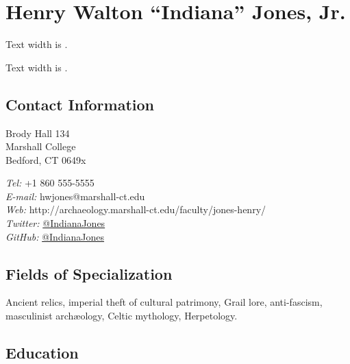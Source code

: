\documentclass[%
    11pt,
  oneside
  ]{memoir}
\begin{document}
      \chapter*{Henry Walton ``Indiana'' Jones, Jr.}
  
  Text width is \the\textwidth.


  \begin{adjustwidth*}{9em}{0em}
  Text width is \the\textwidth.


  \hypertarget{contact-information}{
  \section{Contact Information}\label{contact-information}}
    \begin{minipage}[t]{0.3\textwidth}
      Brody Hall 134\\ Marshall College\\ Bedford, CT 0649x
    \end{minipage}
    \begin{minipage}[t]{0.7\textwidth}
                {\textit{Tel:}} +1 860 555-5555 \\
                        {\textit{E-mail:}} hwjones@marshall-ct.edu \\
                        {\textit{Web:}} http://archaeology.marshall-ct.edu/faculty/jones-henry/ \\
                        {\textit{Twitter:}} \href{http://twitter.com/IndianaJones}{@IndianaJones} \\
                        {\textit{GitHub:}} \href{http://github.com/IndianaJones}{@IndianaJones}
            \end{minipage}
\vspace{-\baselineskip} %
\hypertarget{fields-of-specialization}{%
\section{Fields of Specialization}\label{fields-of-specialization}}

Ancient relics, imperial theft of cultural patrimony, Grail lore,
anti-fascism, masculinist archæology, Celtic mythology, Herpetology.

\hypertarget{education}{%
\section{Education}\label{education}}


\end{adjustwidth*}
\end{document}
